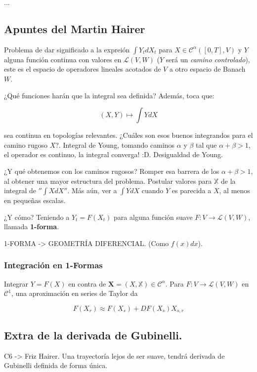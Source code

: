 ...



\subsection{Apuntes del Martin Hairer}

Problema de dar significado a la expreión $\int Y_t dX_t$ para $X \in \mathscr{C}^{\alpha} ([0,T], V)$ y $Y$ alguna función continua con valores en $\mathcal{L}(V,W)$ ($Y$ será un \textit{camino controlado}), este es el espacio de operadores lineales acotados de $V$ a otro espacio de Banach $W$. 

¿Qué funciones harán que la integral sea definida? Además, toca que:

\[
	(X,Y) \mapsto \int Y dX
\]

sea continua en topologías relevantes. ¿Cuáles son esos buenos integrandos para el camino rugoso $X$?. Integral de Young, tomando caminos $\alpha$ y $\beta$ tal que $\alpha + \beta > 1$, el operador es continuo, la integral converga! :D. Desigualdad de Young. 

¿Y qué obtenemos con los caminos rugosos? Romper esa barrera de los $\alpha + \beta > 1$, al obtener una mayor estructura del problema. Postular valores para $\mathbb{X}$ de la integral de $''\int X dX ''$. Más aún, ver a $\int Y dX$ cuando $Y$ es parecida a $X$, al menos en pequeñas escalas.

¿Y cómo? Teniendo a $Y_t = F(X_t)$ para alguna función suave $F: V \rightarrow \mathcal{L}(V,W)$, llamada \textbf{1-forma}.


1-FORMA -> GEOMETRÍA DIFERENCIAL. (Como $f(x) dx$).

\subsubsection{Integración en 1-Formas}

Integrar $Y = F(X)$ en contra de $\mathbf{X} = (X, \mathbb{X}) \in \mathscr{C}^{\alpha}$. Para $F: V \rightarrow \mathcal{L}(V,W)$ en $\mathcal{C}^1$, una aproximación en series de Taylor da

\[
	F(X_r) \approx F(X_s) + DF(X_s) X_{s,r}
\]




\subsection{Extra de la derivada de Gubinelli.}

C6 -> Friz Hairer. Una trayectoría lejos de ser suave, tendrá derivada de Gubinelli definida de forma única.